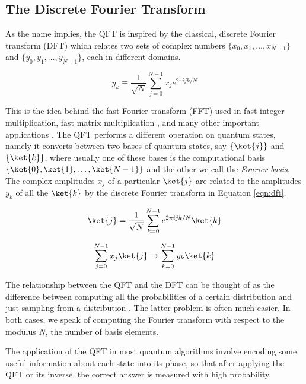 \subsection{The Discrete Fourier Transform}

As the name implies, the QFT is inspired by the classical, discrete
Fourier transform (DFT) which relates two sets of complex numbers
$\{x_0, x_1, \ldots, x_{N-1}\}$ and $\{y_0, y_1, \ldots, y_{N-1}\}$,
each in different domains.

\begin{equation}
y_k \equiv \frac{1}{\sqrt{N}} \sum_{j=0}^{N-1} x_j e^{2\pi i j k / N}
\label{eqn:dft}
\end{equation}

This is the idea behind the fast Fourier transform (FFT) \cite{Cooley1965}
used in fast
integer multiplication, fast matrix multiplication \cite{Schoenhage1971},
and many other
important applications \cite{Maslen1997}. The QFT performs a different
operation on quantum states, namely it converts between two bases of
quantum states,
say $\{\ket{j}\}$ and $\{\ket{k}\}$, where usually one of these bases is
the computational basis $\{\ket{0}, \ket{1}, \ldots, \ket{N-1}\}$
and the other we call the \emph{Fourier basis}. The complex amplitudes
$x_j$ of a
particular $\ket{j}$ are related to the amplitudes $y_k$ of all the $\ket{k}$
by the discrete Fourier transform in Equation \ref{eqn:dft}.

\begin{equation}
\ket{j} = \frac{1}{\sqrt{N}} \sum_{k=0}^{N-1} e^{2\pi i j k / N} \ket{k}
\end{equation}

\begin{equation}
\sum_{j=0}^{N-1} x_j \ket{j} \rightarrow \sum_{k=0}^{N-1} y_k \ket{k}
\end{equation}

The relationship between the QFT and the DFT can be thought of as the
difference between computing all the probabilities of a certain distribution
and just sampling from a distribution \cite{Cleve2000}. The latter problem is
often much easier. In both cases, we speak of computing the Fourier transform
with respect to the modulus $N$, the number of basis elements.

The application of the QFT in most quantum algorithms
involve encoding some useful information about each state into its phase,
so that after applying the QFT or its inverse, the correct answer is measured
with high probability.

